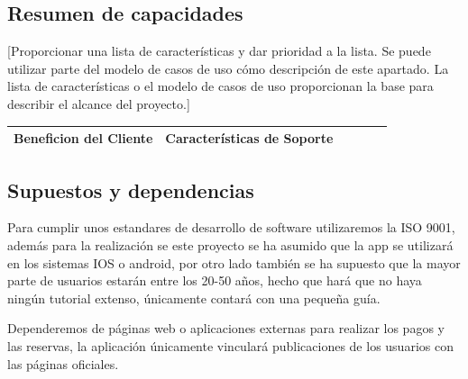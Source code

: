 \documentclass[11pt]{article}
\begin{document}
\subsection{Resumen de capacidades}
[Proporcionar una lista de características y dar prioridad a la lista. Se puede utilizar parte del modelo de casos de uso cómo descripción de este apartado. La lista de características o el modelo de casos de uso proporcionan la base para describir el alcance del proyecto.]

\begin{table}[H]
  \centering
  \begin{tabular}{p{0.4\linewidth}p{0.6\linewidth}}
    \toprule
    \textbf{Beneficion del Cliente} & \textbf{Características de Soporte} \\
    \midrule
    \bottomrule
  \end{tabular}
\end{table}

\subsection{Supuestos y dependencias}

Para cumplir unos estandares de desarrollo de software utilizaremos la ISO 9001, además para la realización se este proyecto se ha asumido que la app  se utilizará en los sistemas IOS o android, por otro lado también se ha supuesto que la mayor parte de usuarios estarán entre los 20-50 años, hecho que hará que no haya ningún tutorial extenso, únicamente contará con una pequeña guía.

Dependeremos de páginas web o aplicaciones externas para realizar los pagos y las reservas, la aplicación únicamente vinculará publicaciones de los usuarios con las páginas oficiales. 
\end{document}
